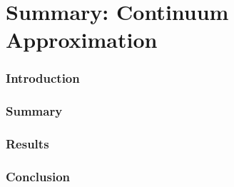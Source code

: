 \documentclass[12pt,letterpaper,cm]{article}
\renewcommand{\.}{\cdot}
\newcommand{\<}{\langle}
\renewcommand{\>}{\rangle}
\begin{document}
	
	
	
	\part*{Summary: Continuum Approximation }
	
	
	
	\section*{Introduction}
	
	
	
	\section*{Summary}
	
	
	
	\section*{Results}	
	
	
	
	\section*{Conclusion}
	
	
	
	
\end{document}
